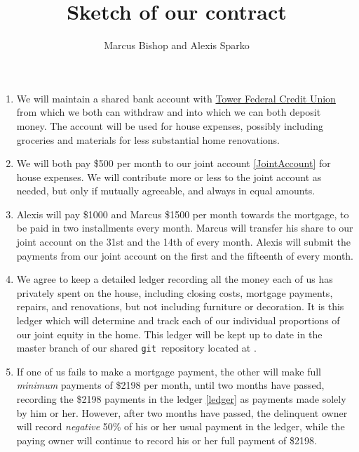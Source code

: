 \documentclass[12pt]{article}
\title{Sketch of our contract}
\author{Marcus Bishop and Alexis Sparko}
\begin{document}
\maketitle

\begin{enumerate}

\item\label{JointAccount}
We will maintain a shared bank account with
\href{https://www.towerfcu.org}{Tower Federal Credit Union}
from which we both can withdraw and into which we can both deposit
money. The account will be used for house expenses, possibly including
groceries and materials for less substantial home renovations.

\item We will both pay \$500 per month to our joint account 
\autoref{JointAccount} for house 
expenses. We will contribute more or less to the joint account as 
needed, but only if mutually agreeable, and always in equal amounts.

\item Alexis will pay \$1000 and Marcus \$1500 per month towards the 
mortgage, to be paid in two installments every month. Marcus will 
transfer his share to our joint account on the 31st and the 14th of 
every month. Alexis will submit the payments from our joint account 
on the first and the fifteenth of every month.

\item\label{ledger} We agree to keep a detailed ledger recording all 
the money each of us has privately spent on the house,
including closing costs, mortgage payments, repairs, and renovations, but not including 
furniture or decoration. It is this ledger which will determine and 
track each of our individual proportions of our joint equity in the home. 
This ledger will be kept up to date in the master branch of our 
shared {\tt git}~repository located at 
.

\item If one of us fails to make a mortgage payment, the other will 
make full {\em minimum} payments of \$2198 per month,
until two months have passed, recording the \$2198
payments in the ledger \autoref{ledger} as payments made solely by 
him or her. However, after two months have passed, the delinquent 
owner will record {\em negative} 50\% of his or her usual payment in 
the ledger, while the paying owner will continue to record his or her 
full payment of \$2198.


\end{enumerate}
\end{document}
